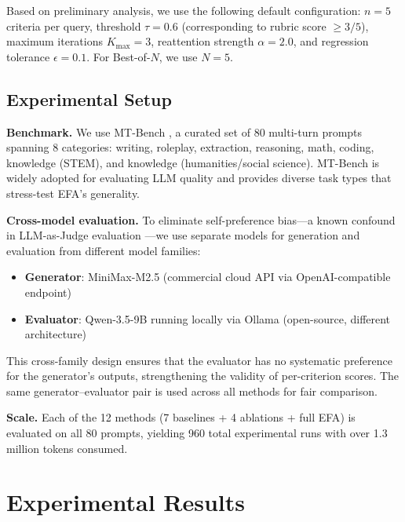 \documentclass[11pt]{article}
\newcommand{\efa}{\textsc{EFA}}  %
\begin{document}
Based on preliminary analysis, we use the following default configuration: $n = 5$ criteria per query, threshold $\tau = 0.6$ (corresponding to rubric score $\geq 3/5$), maximum iterations $K_{\max} = 3$, reattention strength $\alpha = 2.0$, and regression tolerance $\epsilon = 0.1$. For Best-of-$N$, we use $N = 5$.

\subsection{Experimental Setup}

\textbf{Benchmark.} We use MT-Bench \citep{zheng2023judging}, a curated set of 80 multi-turn prompts spanning 8 categories: writing, roleplay, extraction, reasoning, math, coding, knowledge (STEM), and knowledge (humanities/social science). MT-Bench is widely adopted for evaluating LLM quality and provides diverse task types that stress-test \efa{}'s generality.

\textbf{Cross-model evaluation.} To eliminate self-preference bias---a known confound in LLM-as-Judge evaluation \citep{zheng2023judging}---we use separate models for generation and evaluation from different model families:
\begin{itemize}[leftmargin=*]
    \item \textbf{Generator}: MiniMax-M2.5 (commercial cloud API via OpenAI-compatible endpoint)
    \item \textbf{Evaluator}: Qwen-3.5-9B running locally via Ollama (open-source, different architecture)
\end{itemize}

This cross-family design ensures that the evaluator has no systematic preference for the generator's outputs, strengthening the validity of per-criterion scores. The same generator--evaluator pair is used across all methods for fair comparison.

\textbf{Scale.} Each of the 12 methods (7 baselines + 4 ablations + full \efa{}) is evaluated on all 80 prompts, yielding 960 total experimental runs with over 1.3 million tokens consumed.

\section{Experimental Results}
\label{sec:results}
\end{document}

